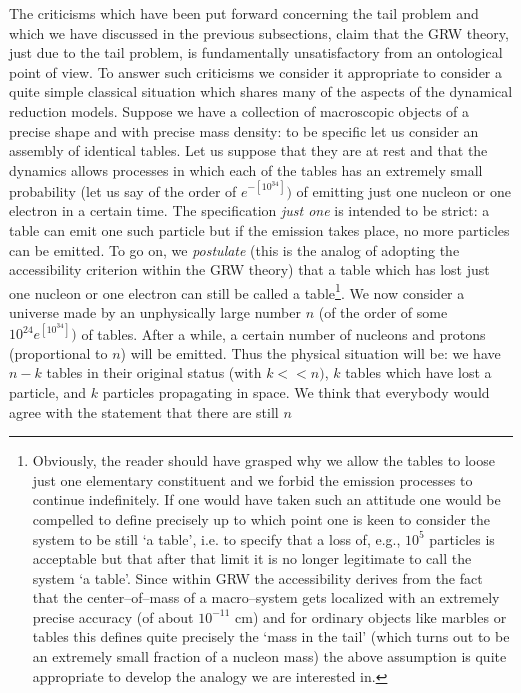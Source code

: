 \documentclass[10pt,a4paper]{article}
\begin{document}
The criticisms which have been put forward concerning the tail
problem and which we have discussed in the previous subsections,
claim that the GRW theory, just due to the tail problem, is
fundamentally unsatisfactory from an ontological point of view. To
answer such criticisms we consider it appropriate to consider a
quite simple classical situation which shares many of the aspects
of the dynamical reduction models. Suppose we have a collection of
macroscopic objects of a precise shape and with precise mass
density: to be specific let us consider an assembly of identical
tables. Let us suppose that they are at rest and that the dynamics
allows processes in which each of the tables has an extremely
small probability (let us say of the order of $e^{-[10^{34}]})$ of
emitting just one nucleon or one electron in a certain time. The
specification {\it just one} is intended to be strict: a table can
emit one such particle but if the emission takes place, no more
particles  can be emitted. To go on, we {\it postulate} (this is
the analog of adopting the accessibility criterion within the GRW
theory) that a table which has lost just one nucleon or one
electron can still be called a table\footnote{Obviously, the
reader should have grasped why we allow the tables to loose just
one elementary constituent and we forbid the emission processes to
continue indefinitely. If one would have taken such an attitude
one would be compelled to define precisely up to which point one
is keen to consider the system to be still `a table', i.e. to
specify that a loss of, e.g., $10^{5}$ particles is acceptable but
that after that limit it is no longer legitimate  to call the
system `a table'. Since within GRW the accessibility derives from
the fact that the center--of--mass of a macro--system gets
localized with an extremely precise  accuracy (of about
$10^{-11}$ cm) and for ordinary objects like marbles or tables
this defines quite precisely the `mass in the tail' (which turns
out to be an extremely small fraction of a nucleon mass) the above
assumption is quite appropriate to develop the analogy we are
interested in.}. We now consider a universe made by an
unphysically large number $n$ (of the order of some
$10^{24}e^{[10^{34}]})$ of tables. After a while, a certain number
of nucleons and protons (proportional to $n$) will be emitted.
Thus the physical situation will be: we have $n-k$ tables in their
original status (with $k<<n)$, $k$ tables which have lost a
particle, and $k$ particles propagating in space. We think that
everybody would agree with the statement that there are still $n$
\end{document}
